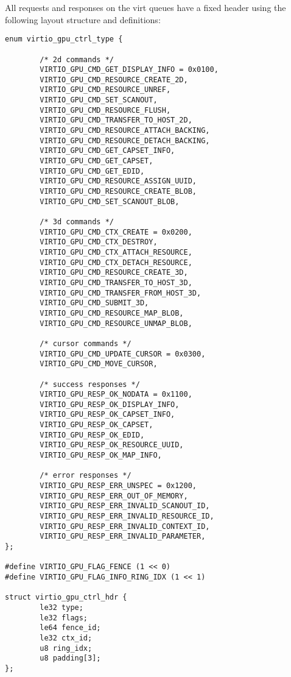 All requests and responses on the virt queues have a fixed header
using the following layout structure and definitions:

\begin{lstlisting}
enum virtio_gpu_ctrl_type {

        /* 2d commands */
        VIRTIO_GPU_CMD_GET_DISPLAY_INFO = 0x0100,
        VIRTIO_GPU_CMD_RESOURCE_CREATE_2D,
        VIRTIO_GPU_CMD_RESOURCE_UNREF,
        VIRTIO_GPU_CMD_SET_SCANOUT,
        VIRTIO_GPU_CMD_RESOURCE_FLUSH,
        VIRTIO_GPU_CMD_TRANSFER_TO_HOST_2D,
        VIRTIO_GPU_CMD_RESOURCE_ATTACH_BACKING,
        VIRTIO_GPU_CMD_RESOURCE_DETACH_BACKING,
        VIRTIO_GPU_CMD_GET_CAPSET_INFO,
        VIRTIO_GPU_CMD_GET_CAPSET,
        VIRTIO_GPU_CMD_GET_EDID,
        VIRTIO_GPU_CMD_RESOURCE_ASSIGN_UUID,
        VIRTIO_GPU_CMD_RESOURCE_CREATE_BLOB,
        VIRTIO_GPU_CMD_SET_SCANOUT_BLOB,

        /* 3d commands */
        VIRTIO_GPU_CMD_CTX_CREATE = 0x0200,
        VIRTIO_GPU_CMD_CTX_DESTROY,
        VIRTIO_GPU_CMD_CTX_ATTACH_RESOURCE,
        VIRTIO_GPU_CMD_CTX_DETACH_RESOURCE,
        VIRTIO_GPU_CMD_RESOURCE_CREATE_3D,
        VIRTIO_GPU_CMD_TRANSFER_TO_HOST_3D,
        VIRTIO_GPU_CMD_TRANSFER_FROM_HOST_3D,
        VIRTIO_GPU_CMD_SUBMIT_3D,
        VIRTIO_GPU_CMD_RESOURCE_MAP_BLOB,
        VIRTIO_GPU_CMD_RESOURCE_UNMAP_BLOB,

        /* cursor commands */
        VIRTIO_GPU_CMD_UPDATE_CURSOR = 0x0300,
        VIRTIO_GPU_CMD_MOVE_CURSOR,

        /* success responses */
        VIRTIO_GPU_RESP_OK_NODATA = 0x1100,
        VIRTIO_GPU_RESP_OK_DISPLAY_INFO,
        VIRTIO_GPU_RESP_OK_CAPSET_INFO,
        VIRTIO_GPU_RESP_OK_CAPSET,
        VIRTIO_GPU_RESP_OK_EDID,
        VIRTIO_GPU_RESP_OK_RESOURCE_UUID,
        VIRTIO_GPU_RESP_OK_MAP_INFO,

        /* error responses */
        VIRTIO_GPU_RESP_ERR_UNSPEC = 0x1200,
        VIRTIO_GPU_RESP_ERR_OUT_OF_MEMORY,
        VIRTIO_GPU_RESP_ERR_INVALID_SCANOUT_ID,
        VIRTIO_GPU_RESP_ERR_INVALID_RESOURCE_ID,
        VIRTIO_GPU_RESP_ERR_INVALID_CONTEXT_ID,
        VIRTIO_GPU_RESP_ERR_INVALID_PARAMETER,
};

#define VIRTIO_GPU_FLAG_FENCE (1 << 0)
#define VIRTIO_GPU_FLAG_INFO_RING_IDX (1 << 1)

struct virtio_gpu_ctrl_hdr {
        le32 type;
        le32 flags;
        le64 fence_id;
        le32 ctx_id;
        u8 ring_idx;
        u8 padding[3];
};
\end{lstlisting}

